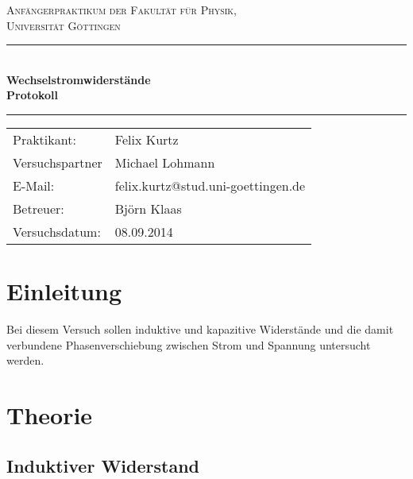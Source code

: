 \documentclass[12pt,a4paper,titlepage,headinclude,bibtotoc]{scrartcl}
\begin{document}
\begin{titlepage}
\centering
\textsc{\Large Anfängerpraktikum der Fakultät für
  Physik,\\[1.5ex] Universität Göttingen}

\vspace*{4.2cm}

\rule{\textwidth}{1pt}\\[0.5cm]
{\huge \bfseries
  Wechselstromwiderstände\\[1.5ex]
  Protokoll}\\[0.5cm]
\rule{\textwidth}{1pt}

\vspace*{2.5cm}

\begin{Large}
\begin{tabular}{ll}
Praktikant: & Felix Kurtz\\
Versuchspartner & Michael Lohmann\\
 E-Mail: &  felix.kurtz@stud.uni-goettingen.de\\
 Betreuer: & Björn Klaas\\
 Versuchsdatum: & 08.09.2014\\
\end{tabular}
\end{Large}

\vspace*{0.8cm}

\begin{Large}
\end{Large}

\end{titlepage}

\tableofcontents

\newpage

\section{Einleitung}
\label{sec:einleitung}
Bei diesem Versuch sollen induktive und kapazitive Widerstände und die damit verbundene Phasenverschiebung zwischen Strom und Spannung untersucht werden.

\section{Theorie}
\label{sec:theorie}
\subsection{Induktiver Widerstand}
\end{document}
